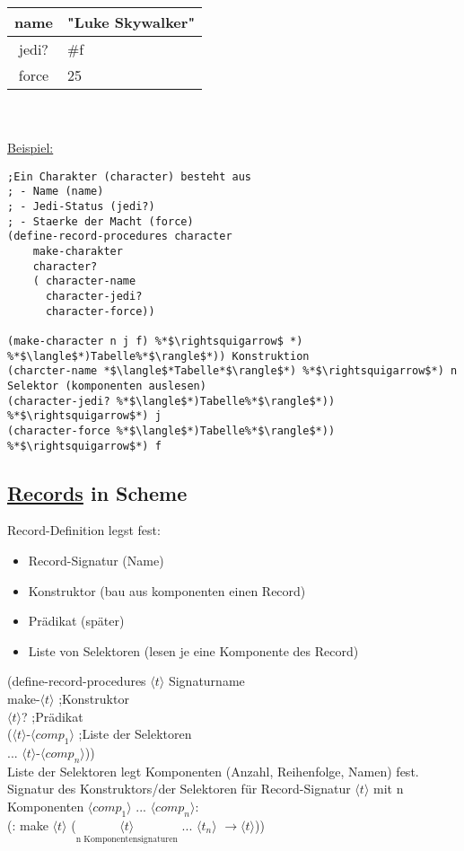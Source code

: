 \documentclass[a4paper,12pt]{article}
\begin{document}
\begin{tabular}{|c|l|}
\hline
name & "Luke Skywalker"\\
\hline
jedi? & \#f\\
\hline
force & 25\\
\hline
\end{tabular}
\\\\
\uline{Beispiel:}
\begin{lstlisting}[style=customc]
;Ein Charakter (character) besteht aus
; - Name (name)
; - Jedi-Status (jedi?)
; - Staerke der Macht (force)
(define-record-procedures character
	make-charakter
	character?
	( character-name
	  character-jedi?
	  character-force))
	  
(make-character n j f) %*$\rightsquigarrow$ *) %*$\langle$*)Tabelle%*$\rangle$*)) Konstruktion
(charcter-name *$\langle$*Tabelle*$\rangle$*) %*$\rightsquigarrow$*) n Selektor (komponenten auslesen)
(character-jedi? %*$\langle$*)Tabelle%*$\rangle$*)) %*$\rightsquigarrow$*) j
(character-force %*$\langle$*)Tabelle%*$\rangle$*)) %*$\rightsquigarrow$*) f
\end{lstlisting}
\subsection{\uline{Records} in Scheme}
Record-Definition legst fest:
\begin{itemize}
\item Record-Signatur (Name)
\item Konstruktor 		(bau aus komponenten einen Record)
\item Prädikat 			(später)
\item Liste von Selektoren (lesen je eine Komponente des Record)
\end{itemize}
(define-record-procedures $\langle t\rangle$        Signaturname\\
	make-$\langle t \rangle$                        ;Konstruktor\\
	$\langle t \rangle$? 							;Prädikat\\
	($\langle t \rangle$-$\langle comp_1 \rangle$   ;Liste der Selektoren\\
	 ...
	 $\langle t \rangle$-$\langle comp_n \rangle$))\\
Liste der Selektoren legt Komponenten (Anzahl, Reihenfolge, Namen) fest.
Signatur des Konstruktors/der Selektoren für Record-Signatur $\langle t \rangle$ mit n Komponenten $\langle comp_1\rangle$ ...  $\langle comp_n\rangle$:\\
(: make $\langle t \rangle$ ($\underset{\text{n Komponentensignaturen}}{\langle t \rangle}$ ... $\langle t_n \rangle$ $\rightarrow \langle t \rangle $))\\
\end{document}
